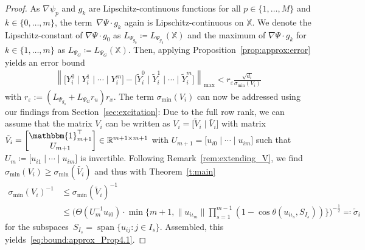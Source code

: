 \documentclass[a4paper, reqno]{amsart}
\newcommand{\R}{\ensuremath{\mathbb R}}
\begin{document}
\begin{proof}
As $\nabla \psi_p$ and $g_k$ are Lipschitz-continuous functions for all $p \in \{1, \dots, M\}$ and $k \in \{0, \dots, m\}$, the term~$\nabla \Psi \cdot g_k$ again is Lipschitz-continuous on $\mathbb{X}$. We denote the Lipschitz-constant of $\nabla \Psi \cdot g_0$ as $L_{\Psi_{g_0}}\coloneqq L_{\Psi_{g_0}}(\mathbb{X})$ and the maximum of $\nabla \Psi \cdot g_k$ for $k \in \{1, \dots, m\}$ as $L_{\Psi_G} \coloneqq L_{\Psi_G}(\mathbb{X})$. 
Then, applying Proposition~\ref{prop:approx:error} yields an error bound 
\begin{align} \label{eq:error:}
         \left\lVert \Big[ {Y}^0_i \mid {Y}^1_i \mid \cdots \mid {Y}^m_i \Big] - \Big[ \tilde{Y}^0_i \mid \tilde{Y}^1_i \mid \cdots \mid \tilde{Y}^m_i \Big]\right\rVert_\mathrm{max} 
        < r_\varepsilon \frac{\sqrt{d_i}}{\sigma_{\min}(V_i)} 
    \end{align}
with $r_\varepsilon := (L_{\Psi_{g_0}} + L_{\Psi_G}r_u)r_x$.
The term $\sigma_{\min}(V_i)$ can now be addressed using our findings from Section~\ref{sec:excitation}: Due to the full row rank, we can assume that the matrix $V_i$ can be written as $V_i = \Big[\tilde{V}_i \mid \bar{V}_i\Big]$ with matrix~$\tilde{V}_i = \begin{bmatrix}\mathbbm{1}_{m+1}^\top\\U_{m+1}\end{bmatrix} \in \R^{m + 1\times m + 1}$ with $U_{m+1} = \big[ {u}_{i0} \mid \cdots \mid {u}_{im} \big]$ such that $U_m \coloneqq \big[ {u}_{i1} \mid \cdots \mid {u}_{im} \big]$ is invertible. 
Following Remark~\ref{rem:extending_V}, we find $\sigma_\mathrm{min}(V_i) \geq \sigma_\mathrm{min}(\tilde{V_i})$ 
and thus with Theorem~\ref{t:main} 
\begin{align*}
   \sigma_{\min} (V_i)^{-1} &\leq \sigma_\mathrm{min}(\tilde{V}_i)^{-1} \\
    &\leq \Big(\Theta(U_m^{-1}u_{i0}) \cdot \min\{m + 1, \|u_{i\iota_m}\| \prod_{s = 1}^{m - 1}(1 - \cos\theta(u_{i\iota_s}, S_{I_s}))\}\Big)^{-\frac12}\eqqcolon \tilde{\sigma}_i
\end{align*}
for the subspaces~$S_{I_s} = \operatorname{span}\{u_{ij} : j\in I_s\}$.
Assembled, this yields~\eqref{eq:bound:approx_Prop4.1}.
\end{proof}
\end{document}
